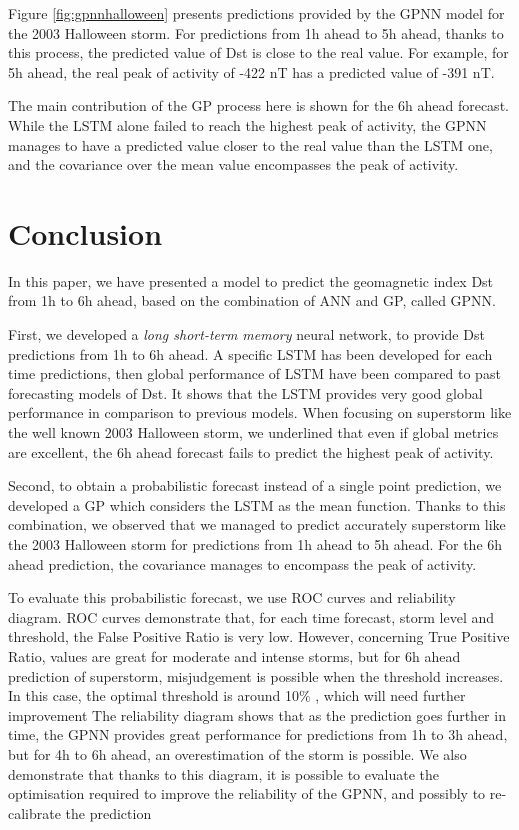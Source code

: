 Figure \ref{fig:gpnnhalloween} presents predictions provided by the GPNN model for the 2003 Halloween storm. 
For predictions from 1h ahead to 5h ahead, thanks to this process, the predicted value of Dst is close to the 
real value. For example, for 5h ahead, the real peak of activity of -422 nT has a predicted value of -391 nT. 

The main contribution of the GP process here is shown for the 6h ahead forecast. While the LSTM alone failed to 
reach the highest peak of activity, the GPNN manages to have a predicted value closer to the real value than 
the LSTM one, and the covariance over the mean value encompasses the peak of activity.



\section{Conclusion}


In this paper, we have presented a model to predict the geomagnetic index Dst from 1h to 6h ahead, 
based on the combination of ANN and GP, called GPNN. 

First, we developed a \emph{long short-term memory} neural network, to provide Dst predictions from 1h to 6h ahead. 
A specific LSTM has been developed for each time predictions, then global performance of LSTM have been compared 
to past forecasting models of Dst. It shows that the LSTM provides very good global performance in comparison 
to previous models. When focusing on superstorm like the well known 2003 Halloween storm, we underlined that 
even if global metrics are excellent, the 6h ahead forecast fails to predict the highest peak of activity. 


Second, to obtain a probabilistic forecast instead of a single point prediction, we developed a GP which 
considers the LSTM as the mean function. Thanks to this combination, we observed that we managed to predict 
accurately superstorm like the 2003 Halloween storm for predictions from 1h ahead to 5h ahead. For the 
6h ahead prediction, the covariance manages to encompass the peak of activity. 

To evaluate this probabilistic forecast, we use ROC curves and reliability diagram. ROC curves demonstrate that, 
for each time forecast, storm level and threshold, the False Positive Ratio is very low. However, concerning 
True Positive Ratio, values are great for moderate and intense storms, but for 6h ahead prediction of superstorm, 
misjudgement is possible when the threshold increases. In this case, the optimal threshold is around 10$\%$ , 
which will need further improvement The reliability diagram shows that as the prediction goes further in time, 
the GPNN provides great performance for predictions from 1h to 3h ahead, but for 4h to 6h ahead, 
an overestimation of the storm is possible. We also demonstrate that thanks to this diagram, it is possible to 
evaluate the optimisation required to improve the reliability of the GPNN, and possibly to 
re-calibrate the prediction


